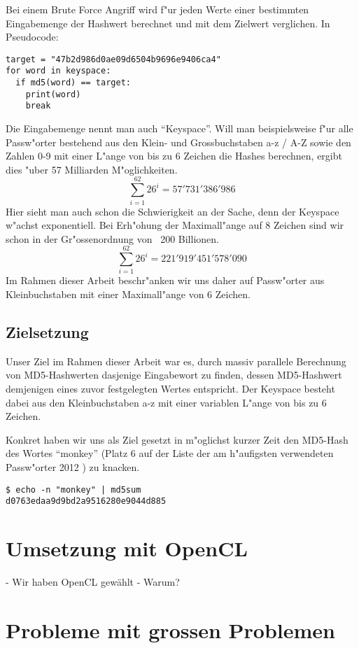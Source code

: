 \begin{refsection}
Bei einem Brute Force Angriff wird f"ur jeden Werte einer bestimmten
Eingabemenge der Hashwert berechnet und mit dem Zielwert verglichen. In
Pseudocode:

\begin{verbatim}
target = "47b2d986d0ae09d6504b9696e9406ca4"
for word in keyspace:
  if md5(word) == target:
    print(word)
    break
\end{verbatim}

Die Eingabemenge nennt man auch ``Keyspace''. Will man beispielsweise f"ur alle
Passw"orter bestehend aus den Klein- und Grossbuchstaben a-z / A-Z sowie den
Zahlen 0-9 mit einer L"ange von bis zu 6 Zeichen die Hashes berechnen, ergibt
dies "uber 57 Milliarden M"oglichkeiten.
\[
	\sum_{i=1}^{62} 26^i = 57'731'386'986
\]
Hier sieht man auch schon die Schwierigkeit an der Sache, denn der Keyspace
w"achst exponentiell. Bei Erh"ohung der Maximall"ange auf 8 Zeichen sind wir schon
in der Gr"ossenordnung von ~200 Billionen.
\[
	\sum_{i=1}^{62} 26^i = 221'919'451'578'090
\]
Im Rahmen dieser Arbeit beschr"anken wir uns daher auf Passw"orter aus
Kleinbuchstaben mit einer Maximall"ange von 6 Zeichen.

\subsection{Zielsetzung}

Unser Ziel im Rahmen dieser Arbeit war es, durch massiv parallele Berechnung von
MD5-Hashwerten dasjenige Eingabewort zu finden, dessen MD5-Hashwert demjenigen
eines zuvor festgelegten Wertes entspricht. Der Keyspace besteht dabei aus den
Kleinbuchstaben a-z mit einer variablen L"ange von bis zu 6 Zeichen.

Konkret haben wir uns als Ziel gesetzt in m"oglichst kurzer Zeit den MD5-Hash
des Wortes ``monkey'' (Platz 6 auf der Liste der am h"aufigsten verwendeten
Passw"orter 2012 \cite{crypto:splash2012}) zu knacken.

\begin{verbatim}
$ echo -n "monkey" | md5sum
d0763edaa9d9bd2a9516280e9044d885
\end{verbatim}

\section{Umsetzung mit OpenCL}

- Wir haben OpenCL gewählt
- Warum?

\section{Probleme mit grossen Problemen}


\end{refsection}

